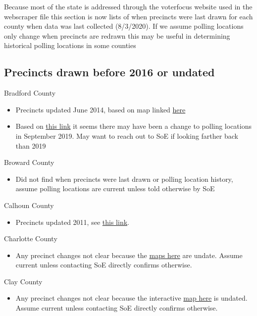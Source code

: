 \documentclass[12pt]{article}
\begin{document}
Because most of the state is addressed through the voterfocus website used in the webscraper file this section is now lists of when precincts were last drawn for each county when data was last collected (8/3/2020). If we assume polling locations only change when precincts are redrawn this may be useful in determining historical polling locations in some counties


\subsection{Precincts drawn before 2016 or undated}

Bradford County
\begin{itemize}
  \item Precincts updated June 2014, based on map linked \href{https://www.bradfordelections.com/Portals/Bradford/Documents/precinct_map.pdf?ver=2014-06-25-110922-550}{here}
  \item Based on \href{https://www.bradfordelections.com/Portals/Bradford/Documents/Bradford%20Polling%20Locations%20with%20Address.pdf?ver=2019-09-26-161907-300}{this link} it seems there may have been a change to polling locations in September 2019. May want to reach out to SoE if looking farther back than 2019
\end{itemize}
Broward County
\begin{itemize}
  \item Did not find when precincts were last drawn or polling location history, assume polling locations are current unless told otherwise by SoE
\end{itemize}
Calhoun County
\begin{itemize}
  \item Precincts updated 2011, see \href{https://www.votecalhoun.com/portals/calhoun/documents/calhouncountyprecinctmap2011.pdf}{this link}.
\end{itemize}
Charlotte County
\begin{itemize}
  \item Any precinct changes not clear because the \href{https://www.charlottevotes.com/Maps/Precinct-Maps}{maps here} are undate. Assume current unless contacting SoE directly confirms otherwise.
\end{itemize}
Clay County
\begin{itemize}
  \item Any precinct changes not clear because the interactive \href{https://www.clayelections.gov/General-Information/Voter-Information-Map}{map here} is undated. Assume current unless contacting SoE directly confirms otherwise.
\end{itemize}
\end{document}

